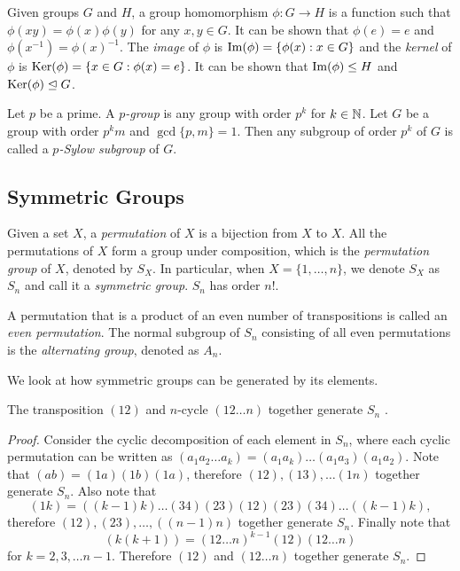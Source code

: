 \begin{definition}
	Given groups $G$ and $H$, a group homomorphism $\phi: G \to H$ is a function such that $\phi(xy) = \phi(x) \phi(y)$ for any $x, y \in G$. It can be shown that $\phi(e) = e$ and $\phi(x^{-1}) = \phi(x) ^ {-1}$. The \textit{image} of $\phi$ is $\operatorname{Im}(\phi) = \{\phi(x) : x\in G\}$ and the \textit{kernel} of $\phi$ is $\operatorname{Ker}(\phi) = \{x \in G : \phi(x) = e\}$. It can be shown that $\operatorname{Im}(\phi) \le H$ and $\operatorname{Ker}(\phi) \trianglelefteq G$.  
\end{definition}

\begin{definition} \label{def:p-group}
	Let $p$ be a prime. A \textit{$p$-group} is any group with order $p^k$ for $k \in \mathbb N$. Let $G$ be a group with order $p^k m$ and $\gcd\{p, m\} = 1$. Then any subgroup of order $p^k$ of $G$ is called a \textit{$p$-Sylow subgroup} of $G$. 
\end{definition}

\subsection{Symmetric Groups}
\begin{definition}  \label{def:permutation}
	Given a set $X$, a \textit{permutation} of $X$ is a bijection from $X$ to $X$. All the permutations of $X$ form a group under composition, which is the \textit{permutation group} of $X$, denoted by $S_X$. In particular, when $X = \{1, \dots, n\}$, we denote $S_X$ as $S_n$ and call it a \textit{symmetric group}. $S_n$ has order $n!$. 
\end{definition}

\begin{definition}
	A permutation that is a product of an even number of transpositions is called an \textit{even permutation}. The normal subgroup of $S_n$ consisting of all even permutations is the \textit{alternating group}, denoted as $A_n$. 
\end{definition}

We look at how symmetric groups can be generated by its elements. 

\begin{theorem} \label{thm:symmetric-12-12n}
	The transposition $(12)$ and $n$-cycle $(12 \dots n)$ together generate $S_n$ . 
\end{theorem}
\begin{proof}
	Consider the cyclic decomposition of each element in $S_n$, where each cyclic permutation can be written as 
	$
	(a_1a_2\dots a_k) = (a_1 a_k) \dots (a_1 a_3) (a_1 a_2). 
	$
	Note that $(ab) = (1a)(1b)(1a)$, therefore $(12), (13), \ldots (1n)$ together generate $S_n$. Also note that  
	$$(1k)=((k-1)k)\dots(34)(23)(12)(23)(34)\dots((k-1)k),$$
	therefore $(12), (23), \dots, ((n-1)n)$ together generate $S_n$. Finally note that 
	$$
	(k(k+1)) = (12\dots n)^{k-1} (12) (12\dots n)
	$$
	for $k = 2, 3, \dots n - 1$. Therefore $(12)$ and $(12 \dots n)$ together generate $S_n$. 
\end{proof}

